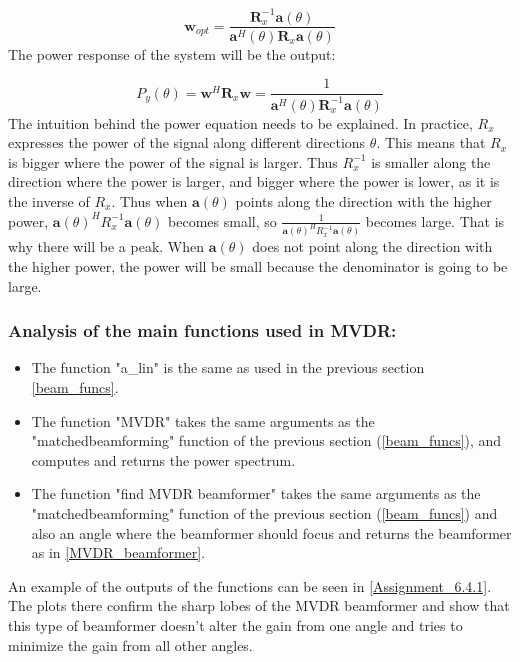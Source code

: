\begin{equation}
\textbf{w}_{opt}=\frac{\textbf{R}_x^{-1}\textbf{a}(\theta)}{\textbf{a}^\textit{H}(\theta)\textbf{R}_x\textbf{a}(\theta)}
\end{equation}
\label{MVDR_beamformer}
The power response of the system will be the output:

\begin{equation}
    P_y(\theta)=\textbf{w}^\textit{H}\textbf{R}_x\textbf{w}=\frac{1}{\textbf{a}^\textit{H}(\theta)\textbf{R}_x^{-1}\textbf{a}(\theta)}
\end{equation}
The intuition behind the power equation needs to be explained. In practice, 
$R_x$ expresses the power of the signal along different directions $\theta$. 
This means that $R_x$ is bigger where the power of the signal is larger. 
Thus $R_x^{-1}$ is smaller along the direction where the power is larger, 
and bigger where the power is lower, as it is the inverse of $R_x$. 
Thus when $\mathbf{a}(\theta)$ points along the direction with the higher power, 
$\mathbf{a}(\theta)^H R_x^{-1} \mathbf{a}(\theta)$ becomes small, so 
$\frac{1}{\mathbf{a}(\theta)^H R_x^{-1} \mathbf{a}(\theta)}$ becomes large. 
That is why there will be a peak. When $\mathbf{a}(\theta)$ does not point along the direction with the higher power, the power will be small because the denominator is going to be large.


\subsubsection{Analysis of the main functions used in MVDR:}
\begin{itemize}
    \item The function "a\_lin" is the same as used in the previous section \ref{beam_funcs}.

    \item The function "MVDR" takes the same arguments as the "matchedbeamforming" function of the previous section (\ref{beam_funcs}), and computes and returns the power spectrum. 

    \item The function "find MVDR beamformer" takes the same arguments as the "matchedbeamforming" function of the previous section (\ref{beam_funcs}) and also an angle where the beamformer should focus and returns the beamformer as in \ref{MVDR_beamformer}.
\end{itemize}
An example of the outputs of the functions can be seen in \ref{Assignment_6.4.1}. The plots there confirm the sharp lobes of the MVDR beamformer and show that this type of beamformer doesn't alter the gain from one angle and tries to minimize the gain from all other angles.


